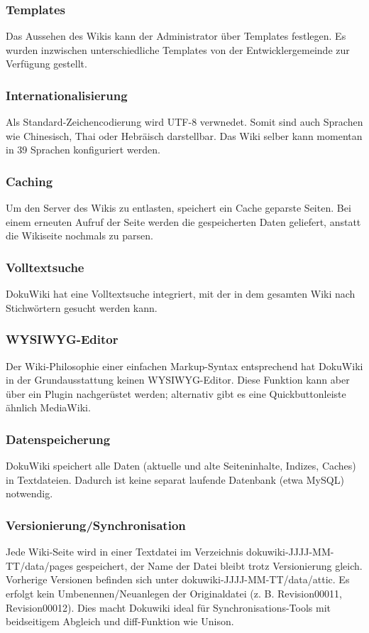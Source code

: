 \documentclass{article}
\begin{document}
\subsubsection{Templates}
Das Aussehen des Wikis kann der Administrator über Templates festlegen. Es wurden inzwischen unterschiedliche Templates von der Entwicklergemeinde zur Verfügung gestellt.
\subsubsection{Internationalisierung}
Als Standard-Zeichencodierung wird UTF-8 verwnedet. Somit sind auch Sprachen wie Chinesisch, Thai oder Hebräisch darstellbar. Das Wiki selber kann momentan in 39 Sprachen konfiguriert werden.
\subsubsection{Caching}
Um den Server des Wikis zu entlasten, speichert ein Cache geparste Seiten. Bei einem erneuten Aufruf der Seite werden die gespeicherten Daten geliefert, anstatt die Wikiseite nochmals zu parsen.
\subsubsection{Volltextsuche}
DokuWiki hat eine Volltextsuche integriert, mit der in dem gesamten Wiki nach Stichwörtern gesucht werden kann.
\subsubsection{WYSIWYG-Editor}
Der Wiki-Philosophie einer einfachen Markup-Syntax entsprechend hat DokuWiki in der Grundausstattung keinen WYSIWYG-Editor. Diese Funktion kann aber über ein Plugin nachgerüstet werden; alternativ gibt es eine Quickbuttonleiste ähnlich MediaWiki.
\subsubsection{Datenspeicherung}
DokuWiki speichert alle Daten (aktuelle und alte Seiteninhalte, Indizes, Caches) in Textdateien. Dadurch ist keine separat laufende Datenbank (etwa MySQL) notwendig.
\subsubsection{Versionierung/Synchronisation}
Jede Wiki-Seite wird in einer Textdatei im Verzeichnis dokuwiki-JJJJ-MM-TT/data/pages gespeichert, der Name der Datei bleibt trotz Versionierung gleich. Vorherige Versionen befinden sich unter dokuwiki-JJJJ-MM-TT/data/attic. Es erfolgt kein Umbenennen/Neuanlegen der Originaldatei (z. B. Revision00011, Revision00012). Dies macht Dokuwiki ideal für Synchronisations-Tools mit beidseitigem Abgleich und diff-Funktion wie Unison.
\end{document}
